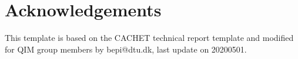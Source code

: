 \chapter{Acknowledgements}
This template is based on the CACHET technical report template and modified for QIM group members by bepi@dtu.dk, last update on 20200501.